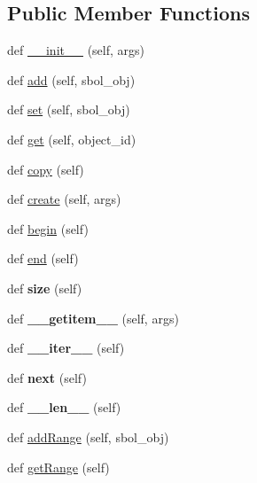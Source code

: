\subsection*{Public Member Functions}
\begin{DoxyCompactItemize}
\item 
def \hyperlink{classsbol_1_1libsbol_1_1owned_module_a7b7efdff6b927ce613bb74034c490993}{\+\_\+\+\_\+init\+\_\+\+\_\+} (self, args)
\item 
def \hyperlink{classsbol_1_1libsbol_1_1owned_module_ae2472562038d9929b4e5ed56da68dc41}{add} (self, sbol\+\_\+obj)
\item 
def \hyperlink{classsbol_1_1libsbol_1_1owned_module_a39a01397e3429fc60eaa5ff356ed3272}{set} (self, sbol\+\_\+obj)
\item 
def \hyperlink{classsbol_1_1libsbol_1_1owned_module_af5f37e53a9cd3cb257328ec51aabd3d7}{get} (self, object\+\_\+id)
\item 
def \hyperlink{classsbol_1_1libsbol_1_1owned_module_ad69e345145bd60b9de3fdcd0375b36ea}{copy} (self)
\item 
def \hyperlink{classsbol_1_1libsbol_1_1owned_module_a1ab74713732b4d37abb8ec67ffa98143}{create} (self, args)
\item 
def \hyperlink{classsbol_1_1libsbol_1_1owned_module_a7d1bce303907e19c090fd915e4c41ee7}{begin} (self)
\item 
def \hyperlink{classsbol_1_1libsbol_1_1owned_module_a25abde762b1e941079d7ae4ba0a90c53}{end} (self)
\item 
def {\bfseries size} (self)\hypertarget{classsbol_1_1libsbol_1_1owned_module_a774b565549fd59ef4fdf12f62465dea1}{}\label{classsbol_1_1libsbol_1_1owned_module_a774b565549fd59ef4fdf12f62465dea1}

\item 
def {\bfseries \+\_\+\+\_\+getitem\+\_\+\+\_\+} (self, args)\hypertarget{classsbol_1_1libsbol_1_1owned_module_a3c70bd3da2d0ee19f3d09e2f6418eb8d}{}\label{classsbol_1_1libsbol_1_1owned_module_a3c70bd3da2d0ee19f3d09e2f6418eb8d}

\item 
def {\bfseries \+\_\+\+\_\+iter\+\_\+\+\_\+} (self)\hypertarget{classsbol_1_1libsbol_1_1owned_module_a066fa224a56ca958a730bf3d67205898}{}\label{classsbol_1_1libsbol_1_1owned_module_a066fa224a56ca958a730bf3d67205898}

\item 
def {\bfseries next} (self)\hypertarget{classsbol_1_1libsbol_1_1owned_module_a912d31f9bc2eb9f69c7cd2657c729266}{}\label{classsbol_1_1libsbol_1_1owned_module_a912d31f9bc2eb9f69c7cd2657c729266}

\item 
def {\bfseries \+\_\+\+\_\+len\+\_\+\+\_\+} (self)\hypertarget{classsbol_1_1libsbol_1_1owned_module_a9548ca13b2064cc3f5c4bd0426a8cd04}{}\label{classsbol_1_1libsbol_1_1owned_module_a9548ca13b2064cc3f5c4bd0426a8cd04}

\item 
def \hyperlink{classsbol_1_1libsbol_1_1owned_module_af337fdebd37abea375b7f18f9d8b4191}{add\+Range} (self, sbol\+\_\+obj)
\item 
def \hyperlink{classsbol_1_1libsbol_1_1owned_module_a4fbef4adc3046944efc15c7807996194}{get\+Range} (self)
\end{DoxyCompactItemize}
